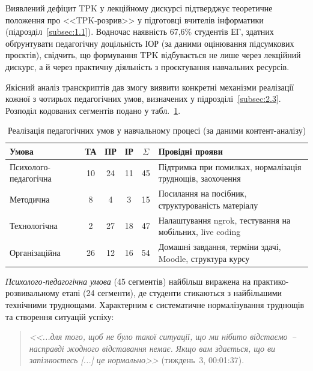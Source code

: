 Виявлений дефіцит TPK у лекційному дискурсі підтверджує теоретичне положення про <<TPK-розрив>> у підготовці вчителів інформатики (підрозділ~\ref{subsec:1.1}). Водночас наявність 67,6\% студентів ЕГ, здатних обґрунтувати педагогічну доцільність ІОР (за даними оцінювання підсумкових проєктів), свідчить, що формування TPK відбувається не лише через лекційний дискурс, а й через практичну діяльність з проєктування навчальних ресурсів.


Якісний аналіз транскриптів дав змогу виявити конкретні механізми реалізації кожної з чотирьох педагогічних умов, визначених у підрозділі~\ref{subsec:2.3}. Розподіл кодованих сегментів подано у табл.~\ref{tab:conditions_evidence}.

\begin{table}[!h]
\centering
\caption{Реалізація педагогічних умов у навчальному процесі (за даними контент-аналізу)}
\label{tab:conditions_evidence}
\small
\begin{tabular}{|p{2.8cm}|c|c|c|c|p{5cm}|}
\hline
\textbf{Умова} & \textbf{ТА} & \textbf{ПР} & \textbf{ІР} & \textbf{$\Sigma$} & \textbf{Провідні прояви} \\
\hline
Психолого-педагогічна & 10 & 24 & 11 & 45 & Підтримка при помилках, нормалізація труднощів, заохочення \\
\hline
Методична & 8 & 4 & 3 & 15 & Посилання на посібник, структурованість матеріалу \\
\hline
Технологічна & 2 & 27 & 18 & 47 & Налаштування ngrok, тестування на мобільних, live coding \\
\hline
Організаційна & 26 & 12 & 16 & 54 & Домашні завдання, терміни здачі, Moodle, структура курсу \\
\hline
\end{tabular}
\end{table}

\textit{Психолого-педагогічна умова} (45 сегментів) найбільш виражена на практико-розвивальному етапі (24 сегменти), де студенти стикаються з найбільшими технічними труднощами. Характерним є систематичне нормалізування труднощів та створення ситуацій успіху:

\begin{quote}
\textit{<<...для того, щоб не було такої ситуації, що ми нібито відстаємо~--насправді жодного відставання немає. Якщо вам здається, що ви запізнюєтесь \textnormal{[...]} це нормально>>} (тиждень~3, 00:01:37).
\end{quote}

